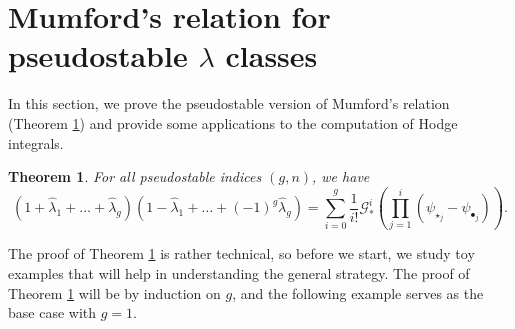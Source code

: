 \documentclass[leqno,12pt]{amsart}
\newtheorem{theorem}{Theorem}[section]
\theoremstyle{remark}
\numberwithin{equation}{section}
\begin{document}
    


\section{Mumford's relation for pseudostable $\lambda$ classes}\label{sec:Mumford}

In this section, we prove the pseudostable version of Mumford's relation (Theorem \ref{MFPC}) and provide some applications to the computation of Hodge integrals.

\begin{theorem} \label{MFPC} For all pseudostable indices $(g, n)$, we have 
$$
(1 + \hat\lambda_1 + \dots + \hat\lambda_g)(1 - \hat\lambda_1 + \dots + (-1)^g\hat\lambda_g) =  \sum_{i=0}^g\frac{1}{i!}\mathcal{G}_*^i\left(\prod_{j=1}^i(\psi_{\star_j}-\psi_{\bullet_j})\right).
$$
\end{theorem}

The proof of Theorem \ref{MFPC} is rather technical, so before we start, we study toy examples that will help in understanding the general strategy. The proof of Theorem \ref{MFPC} will be by induction on $g$, and the following example  serves as the base case with $g = 1$.
\end{document}
